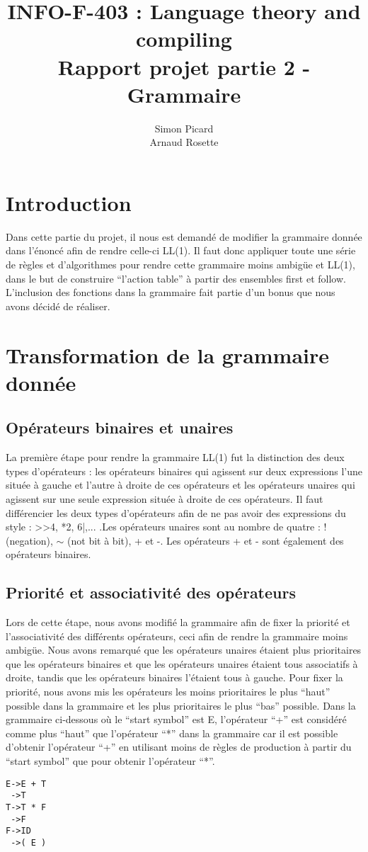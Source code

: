 \documentclass[a4paper,10pt]{article}
\title{INFO-F-403 : Language theory and compiling \\ Rapport projet partie 2 - Grammaire}
\author{Simon Picard \\ Arnaud Rosette}
\begin{document}
\maketitle

\section{Introduction}
Dans cette partie du projet, il nous est demandé de modifier la grammaire donnée dans l'énoncé afin de rendre celle-ci LL(1). Il faut donc appliquer toute une série de règles et d'algorithmes pour rendre cette grammaire moins ambigüe et LL(1), dans le but de construire ``l'action table'' à partir des ensembles first et follow. L'inclusion des fonctions dans la grammaire fait partie d'un bonus que nous avons décidé de réaliser.

\section{Transformation de la grammaire donnée}
\subsection{Opérateurs binaires et unaires}
La première étape pour rendre la grammaire LL(1) fut la distinction des deux types d'opérateurs : les opérateurs binaires qui agissent sur deux expressions l'une située à gauche et l'autre à droite de ces opérateurs et les opérateurs unaires qui agissent sur une seule expression située à droite de ces opérateurs. Il faut différencier les deux types d'opérateurs afin de ne pas avoir des expressions du style : >>4, *2, 6|,... .Les opérateurs unaires sont au nombre de quatre : ! (negation), $\sim$ (not bit à bit), + et -. Les opérateurs + et - sont également des opérateurs binaires. 
\subsection{Priorité et associativité des opérateurs}
Lors de cette étape, nous avons modifié la grammaire afin de fixer la priorité et l'associativité des différents opérateurs, ceci afin de rendre la grammaire moins ambigüe. Nous avons remarqué que les opérateurs unaires étaient plus prioritaires que les opérateurs binaires et que les opérateurs unaires étaient tous associatifs à droite, tandis que les opérateurs binaires l'étaient tous à gauche. Pour fixer la priorité, nous avons mis les opérateurs les moins prioritaires le plus ``haut'' possible dans la grammaire et les plus prioritaires le plus ``bas'' possible. 
Dans la grammaire ci-dessous où le ``start symbol'' est E, l'opérateur ``+'' est considéré comme plus ``haut'' que l'opérateur ``*'' dans la grammaire car il est possible d'obtenir l'opérateur ``+'' en utilisant moins de règles de production à partir du ``start symbol'' que pour obtenir l'opérateur ``*''.
\begin{verbatim}
E->E + T
 ->T
T->T * F
 ->F
F->ID
 ->( E )
\end{verbatim}
\end{document}
